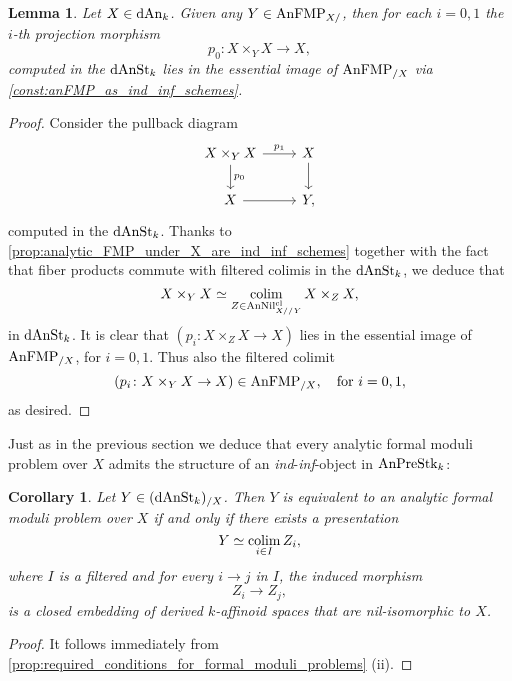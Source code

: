 \documentclass[10pt,a4paper,reqno]{amsart} %
\theoremstyle{plain}
\newtheorem{lem}[thm]{Lemma}
\newtheorem{cor}[thm]{Corollary}
\theoremstyle{definition}
\theoremstyle{remark}
\numberwithin{equation}{section}
\begin{document}
\begin{lem} \label{formal_moduli_under_induce_formal_moduli_over_via_base_change}
    Let $X \in \mathrm{dAn}_k$. Given any $Y \in \mathrm{AnFMP}_{X/ }$, then for each $i= 0, 1$ the $i$-th projection morphism
        \[
            p_0 \colon X \times_Y X \to X,  
        \]
    computed in the \infcat $\mathrm{dAnSt}_k$ lies in the essential image of $\mathrm{AnFMP}_{/X}$ via \cref{const:anFMP_as_ind_inf_schemes}.
\end{lem}

\begin{proof}
    Consider the pullback diagram
        \[
        \begin{tikzcd}
            X \times_Y X \ar{r}{p_1} \ar{d}{p_0} & X \ar{d} \\
            X \ar{r} & Y ,
        \end{tikzcd}
        \]
    computed in the \infcat $\mathrm{dAnSt}_k$. Thanks to \cref{prop:analytic_FMP_under_X_are_ind_inf_schemes} together with the fact that fiber products commute with filtered colimis in the \infcat $\mathrm{dAnSt}_k$,
    we deduce that
        \[
            X \times_Y X \simeq \operatorname*{colim}_{Z \in \mathrm{AnNil}^{\mathrm{cl}}_{X//Y}} X \times_Z X, 
        \]
    in $\mathrm{dAnSt}_k$. It is clear that $(p_i \colon X \times_Z X \to X)$ lies in the essential image of $ \mathrm{AnFMP}_{/X}$, for $i = 0, 1$. Thus also the filtered colimit
        \[
            (p_i \colon X \times_Y X \to X) \in \mathrm{AnFMP}_{/X}, \quad \mathrm{for \ } i = 0, 1,
        \]  
    as desired.
\end{proof}


Just as in the previous section we deduce that every analytic formal moduli problem over $X$ admits the structure of an \emph{ind}-\emph{inf}-object
in $\mathrm{AnPreStk}_k$:

\begin{cor} \label{cor:formal_moduli_problems_over_X_are_ind_inf_objects}
    Let $Y \in (\mathrm{dAnSt}_k)_{/X}$. Then $Y$ is equivalent to an analytic formal moduli problem over $X$ if and only if there exists
    a presentation 
        \[Y \simeq \operatorname*{colim}_{i \in I} Z_i,\]
    where $I$ is a filtered \infcat and for every $i \to j$ in $I$, the induced morphism
        \[
          Z_i \to Z_j,  
        \]
    is a closed embedding of derived $k$-affinoid spaces that are nil-isomorphic to $X$.
\end{cor}

\begin{proof}
    It follows immediately from \cref{prop:required_conditions_for_formal_moduli_problems} (ii).
\end{proof}
\end{document}
